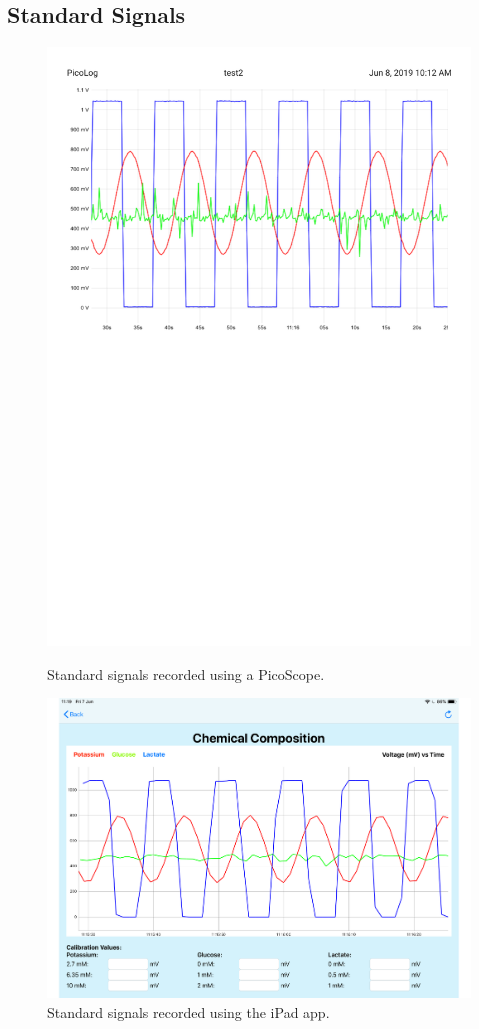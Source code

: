 \subsection{Standard Signals}

\begin{figure}[h!]
\centering
\includegraphics[trim={0cm 0cm 0cm  0cm}, clip, width=.75\textwidth]{./figures/standardsignals/picologChemComp.pdf}
\captionsetup{justification=centering}
\caption{Standard signals recorded using a PicoScope.}
\label{fig: test1 picolog}
\bigbreak
\includegraphics[trim={0cm 0cm 0cm  0cm}, clip, width=.75\textwidth]{./figures/standardsignals/appChemComp.pdf}
\captionsetup{justification=centering}
\caption{Standard signals recorded using the iPad app.}
\label{fig: test1 app}
\end{figure}



